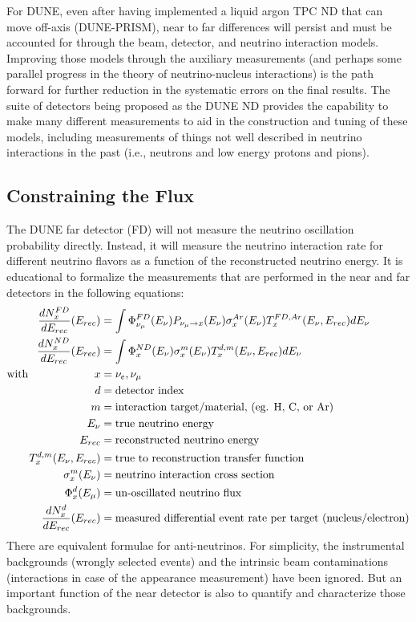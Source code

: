 For DUNE, even after having implemented a liquid argon TPC ND that can move off-axis (DUNE-PRISM), near to far differences will persist and must be accounted for through the beam, detector, and neutrino interaction models.  Improving those models through the auxiliary measurements (and perhaps some parallel progress in the theory of neutrino-nucleus interactions) is the path forward for further reduction in the systematic errors on the final results.  The suite of detectors being proposed as the DUNE ND provides the capability to make many different measurements to aid in the construction and tuning of these models, including measurements of things not well described in neutrino interactions in the past  (i.e., neutrons and low energy protons and pions).  


\subsection{Constraining the Flux}
\label{sec:flux}

The DUNE far detector (FD) will not measure the neutrino oscillation probability directly. Instead, it will measure the neutrino interaction rate for different neutrino flavors as a function of the reconstructed neutrino energy. It is educational to formalize the measurements that are performed in the near and far detectors in the following equations:
\begin{align}
\label{eq:fdrate}
\frac{dN^{FD}_{x}}{dE_{rec}}(E_{rec}) & = 
\int \Phi^{FD}_{\nu_\mu}(E_\nu)P_{\nu_\mu\rightarrow x}(E_\nu)\sigma^{Ar}_x(E_\nu)T^{FD,Ar}_x(E_\nu,E_{rec})dE_\nu\\
\frac{dN^{ND}_{x}}{dE_{rec}}(E_{rec}) & = 
\int \Phi^{ND}_{x}(E_\nu)\sigma^m_x(E_\nu)T^{d,m}_x(E_\nu,E_{rec})dE_\nu\\
\mbox{with\hspace{2cm} } x & = \nu_e , \nu_\mu \nonumber \\
d & = \mbox{detector index} \nonumber \\
m & = \mbox{interaction target/material, (eg. H, C, or Ar)} \nonumber \\
E_\nu & = \mbox{true neutrino energy} \nonumber \\
E_{rec} & = \mbox{reconstructed neutrino energy} \nonumber \\
T^{d,m}_x(E_\nu,E_{rec}) & = \mbox{true to reconstruction transfer function} \nonumber \\
\sigma^m_x(E_\nu) & = \mbox{neutrino interaction cross section} \nonumber \\
\Phi^{d}_x(E_\mu) & = \mbox{un-oscillated neutrino flux} \nonumber \\
\frac{dN^{d}_{x}}{dE_{rec}}(E_{rec}) & = \mbox{measured differential event rate per target (nucleus/electron)} \nonumber 
\end{align}
There are equivalent formulae for anti-neutrinos. For simplicity, the instrumental backgrounds (wrongly selected events) and the intrinsic beam contaminations (\nue interactions in case of the appearance measurement) have been ignored. But an important function of the near detector is also to quantify and characterize those backgrounds.

